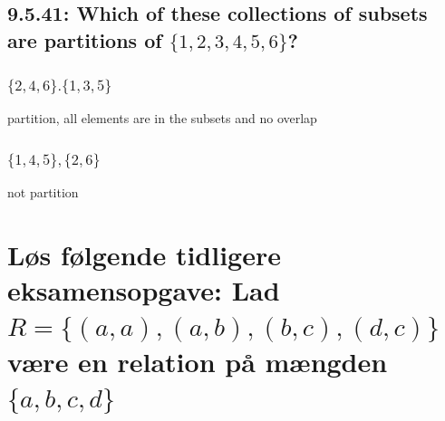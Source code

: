 \documentclass[12pt, a4paper]{report}
\begin{document}
				\subsection{9.5.41: Which of these collections of subsets are partitions of $\{1,2,3,4,5,6\}$?}
					\setcounter{subsubsection}{2}
					\subsubsection{$\{2,4,6\}.\{1,3,5\}$}
						partition, all elements are in the subsets and no overlap
					\subsubsection{$\{1,4,5\},\{2,6\}$}
						not partition
				\setcounter{subsection}{1}
			\section{Løs følgende tidligere eksamensopgave: Lad $R=\{(a,a),(a,b),(b,c),(d,c)\}$ være en relation på mængden $\{a,b,c,d\}$}
\end{document}
